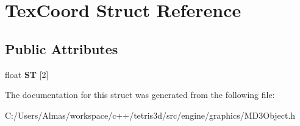 \hypertarget{struct_tex_coord}{\section{Tex\-Coord Struct Reference}
\label{struct_tex_coord}
}
\subsection*{Public Attributes}
\begin{DoxyCompactItemize}
\item 
\hypertarget{struct_tex_coord_a6184b2045c4b5313ecc048c93b18b690}{float {\bfseries S\-T} \mbox{[}2\mbox{]}}\label{struct_tex_coord_a6184b2045c4b5313ecc048c93b18b690}

\end{DoxyCompactItemize}


The documentation for this struct was generated from the following file\-:\begin{DoxyCompactItemize}
\item 
C\-:/\-Users/\-Almas/workspace/c++/tetris3d/src/engine/graphics/M\-D3\-Object.\-h\end{DoxyCompactItemize}
